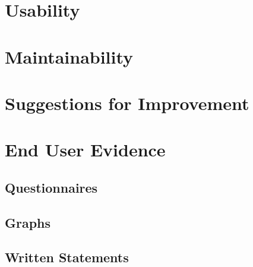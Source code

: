 \section{Usability}

\section{Maintainability}

\section{Suggestions for Improvement}

\section{End User Evidence}

\subsection{Questionnaires}

\subsection{Graphs}

\subsection{Written Statements}
